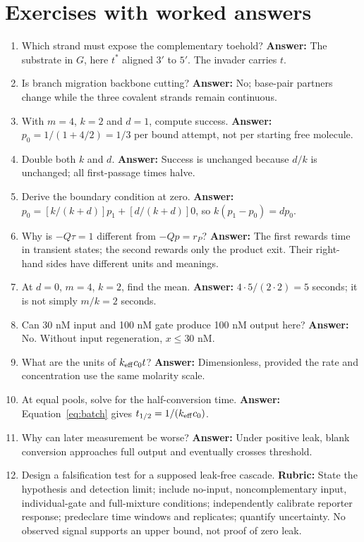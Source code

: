 \section{Exercises with worked answers}
\begin{enumerate}
\item Which strand must expose the complementary toehold? \textbf{Answer:}
The substrate in $G$, here $t^*$ aligned $3'$ to $5'$. The invader carries $t$.
\item Is branch migration backbone cutting? \textbf{Answer:} No; base-pair
partners change while the three covalent strands remain continuous.
\item With $m=4$, $k=2$ and $d=1$, compute success. \textbf{Answer:}
$p_0=1/(1+4/2)=1/3$ per bound attempt, not per starting free molecule.
\item Double both $k$ and $d$. \textbf{Answer:} Success is unchanged because
$d/k$ is unchanged; all first-passage times halve.
\item Derive the boundary condition at zero. \textbf{Answer:}
$p_0=[k/(k+d)]p_1+[d/(k+d)]0$, so $k(p_1-p_0)=dp_0$.
\item Why is $-Q\tau=1$ different from $-Qp=r_P$? \textbf{Answer:}
The first rewards time in transient states; the second rewards only the
product exit. Their right-hand sides have different units and meanings.
\item At $d=0$, $m=4$, $k=2$, find the mean. \textbf{Answer:}
$4\cdot5/(2\cdot2)=5$ seconds; it is not simply $m/k=2$ seconds.
\item Can 30 nM input and 100 nM gate produce 100 nM output here?
\textbf{Answer:} No. Without input regeneration, $x\leq30$ nM.
\item What are the units of $k_{\rm eff}c_0t$? \textbf{Answer:} Dimensionless,
provided the rate and concentration use the same molarity scale.
\item At equal pools, solve for the half-conversion time. \textbf{Answer:}
Equation~\ref{eq:batch} gives $t_{1/2}=1/(k_{\rm eff}c_0)$.
\item Why can later measurement be worse? \textbf{Answer:} Under positive
leak, blank conversion approaches full output and eventually crosses threshold.
\item Design a falsification test for a supposed leak-free cascade.
\textbf{Rubric:} State the hypothesis and detection limit; include no-input,
noncomplementary input, individual-gate and full-mixture conditions; independently
calibrate reporter response; predeclare time windows and replicates; quantify
uncertainty. No observed signal supports an upper bound, not proof of zero leak.
\end{enumerate}

